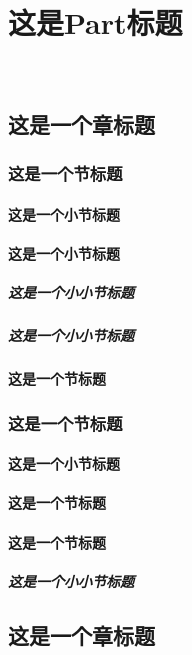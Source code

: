 \documentclass[UTF8,fontset = windows,zihao=-4,scheme=chinese,space=auto,linespread=1.25,oneside]{ctexbook}
\begin{document}
	\part{这是Part标题}	\CTEXthepart~\CTEXthesection %
	\chapter{这是一个章标题}%
	\section{这是一个节标题}\CTEXthesection
	\subsection{这是一个小节标题}\CTEXthesubsection
	\subsection{这是一个小节标题}
	\subsubsection{这是一个小小节标题}
	\subsubsection{这是一个小小节标题}
	\subsection{这是一个节标题}\CTEXthesection

	\section{这是一个节标题}
	\CTEXthesection
	\subsection{这是一个小节标题}%
	\subsection{这是一个节标题}
	\subsection{这是一个节标题}
	\subsubsection{这是一个小小节标题}

	\chapter{这是一个章标题}%
\end{document}
